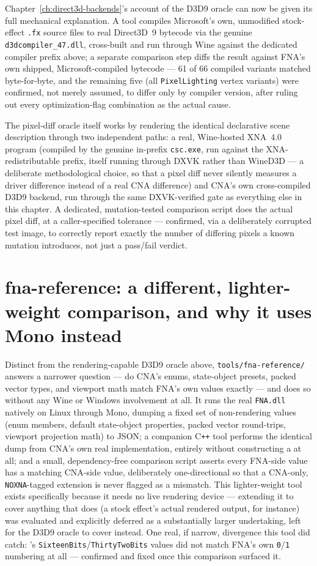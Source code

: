 Chapter~\ref{ch:direct3d-backends}'s account of the D3D9 oracle can now be given its full
mechanical explanation. A tool compiles Microsoft's own, unmodified stock-effect \texttt{.fx}
source files to real Direct3D~9 bytecode via the genuine \texttt{d3dcompiler\_47.dll},
cross-built and run through Wine against the dedicated compiler prefix above; a separate
comparison step diffs the result against FNA's own shipped, Microsoft-compiled bytecode ---
61 of 66 compiled variants matched byte-for-byte, and the remaining five (all
\texttt{PixelLighting} vertex variants) were confirmed, not merely assumed, to differ only by
compiler version, after ruling out every optimization-flag combination as the actual cause.

The pixel-diff oracle itself works by rendering the identical declarative scene description
through two independent paths: a real, Wine-hosted XNA~4.0 program (compiled by the genuine
in-prefix \texttt{csc.exe}, run against the XNA-redistributable prefix, itself running
through DXVK rather than WineD3D --- a deliberate methodological choice, so that a pixel diff
never silently measures a driver difference instead of a real CNA difference) and CNA's own
cross-compiled D3D9 backend, run through the same DXVK-verified gate as everything else in
this chapter. A dedicated, mutation-tested comparison script does the actual pixel diff, at
a caller-specified tolerance --- confirmed, via a deliberately corrupted test image, to
correctly report exactly the number of differing pixels a known mutation introduces, not just
a pass/fail verdict.

\section{fna-reference: a different, lighter-weight comparison, and why it uses Mono instead}

Distinct from the rendering-capable D3D9 oracle above, \texttt{tools/fna-reference/} answers
a narrower question --- do CNA's enums, state-object presets, packed vector types, and
viewport math match FNA's own values exactly --- and does so without any Wine or Windows
involvement at all. It runs the real \texttt{FNA.dll} natively on Linux through Mono, dumping
a fixed set of non-rendering values (enum members, default state-object properties, packed
vector round-trips, viewport projection math) to JSON; a companion C\texttt{++} tool performs
the identical dump from CNA's own real implementation, entirely without constructing a
 at all; and a small, dependency-free comparison script asserts every
FNA-side value has a matching CNA-side value, deliberately one-directional so that a
CNA-only, \texttt{NOXNA}-tagged extension is never flagged as a mismatch. This lighter-weight
tool exists specifically because it needs no live rendering device --- extending it to cover
anything that does (a stock effect's actual rendered output, for instance) was evaluated and
explicitly deferred as a substantially larger undertaking, left for the D3D9 oracle to cover
instead. One real, if narrow, divergence this tool did catch: 's
\texttt{SixteenBits}/\texttt{ThirtyTwoBits} values did not match FNA's own \texttt{0}/\texttt{1}
numbering at all --- confirmed and fixed once this comparison surfaced it.
